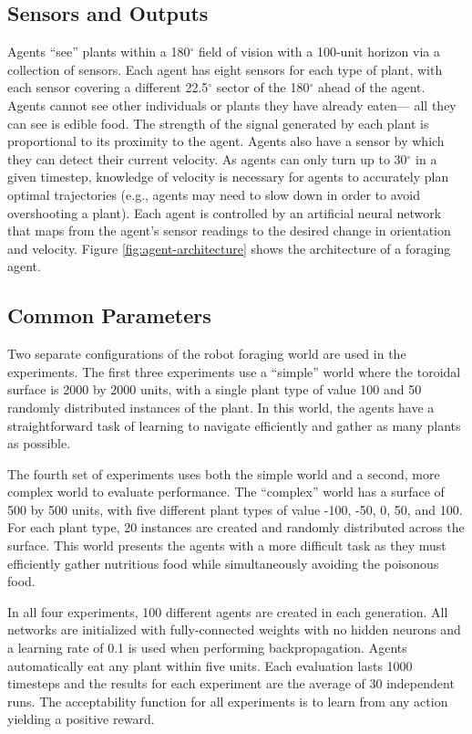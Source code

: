 \documentclass{sig-alternate}
\begin{document}
\subsection{Sensors and Outputs}

Agents ``see'' plants within a 180$^\circ$ field of vision with a 100-unit horizon via a collection of sensors. Each agent has eight sensors for each type of plant, with each sensor covering a different 22.5$^\circ$ sector of the 180$^\circ$ ahead of the agent. Agents cannot see other individuals or plants they have already eaten--- all they can see is edible food. The strength of the signal generated by each plant is proportional to its proximity to the agent. Agents also have a sensor by which they can detect their current velocity. As agents can only turn up to 30$^\circ$ in a given timestep, knowledge of velocity is necessary for agents to accurately plan optimal trajectories (e.g., agents may need to slow down in order to avoid overshooting a plant).  Each agent is controlled by an artificial neural network that maps from the agent's sensor readings to the desired change in orientation and velocity. Figure \ref{fig:agent-architecture} shows the architecture of a foraging agent.

\subsection{Common Parameters}

Two separate configurations of the robot foraging world are used in the experiments. The first three experiments use a ``simple'' world where the toroidal surface is 2000 by 2000 units, with a single plant type of value 100 and 50 randomly distributed instances of the plant. In this world, the agents have a straightforward task of learning to navigate efficiently and gather as many plants as possible.

The fourth set of experiments uses both the simple world and a second, more complex world to evaluate performance. The ``complex'' world has a surface of 500 by 500 units, with five different plant types of value -100, -50, 0, 50, and 100. For each plant type, 20 instances are created and randomly distributed across the surface. This world presents the agents with a more difficult task as they must efficiently gather nutritious food while simultaneously avoiding the poisonous food.

In all four experiments, 100 different agents are created in each generation. All networks are initialized with fully-connected weights with no hidden neurons and a learning rate of 0.1 is used when performing backpropagation. Agents automatically eat any plant within five units. Each evaluation lasts 1000 timesteps and the results for each experiment are the average of 30 independent runs. The acceptability function for all experiments is to learn from any action yielding a positive reward.
\end{document}

